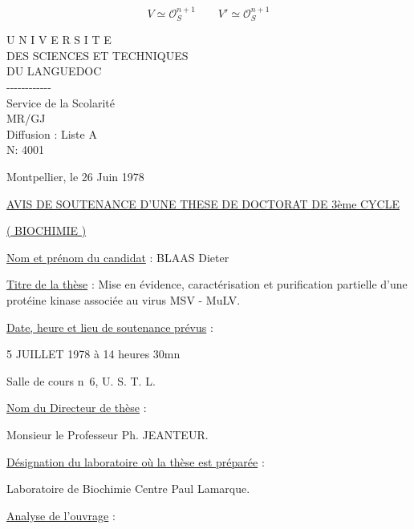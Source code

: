 \[
V\simeq\mathcal O_S^{n+1}\qquad V'\simeq\mathcal O_S^{n+1}
\]

\begin{center}
U N I V E R S I T E\\
DES SCIENCES ET TECHNIQUES\\
DU LANGUEDOC\\
-{}-{}-{}-{}-{}-{}-{}-{}-{}-{}-{}-\\
Service de la Scolarité\\
MR/GJ\\
Diffusion : Liste A\\
N\textdegree: 4001
\end{center}
Montpellier, le 26 Juin 1978

\begin{center}
\uline{AVIS DE SOUTENANCE D'UNE THESE DE DOCTORAT DE 3ème CYCLE}

\uline{( BIOCHIMIE )}
\end{center}

\uline{Nom et prénom du candidat} : BLAAS Dieter

\uline{Titre de la thèse} : Mise en évidence, caractérisation et purification partielle
d'une protéine kinase associée au virus MSV - MuLV.

\uline{Date, heure et lieu de soutenance prévus} :

5 JUILLET 1978 à 14 heures 30mn

Salle de cours n\textdegree\ 6, U. S. T. L.

\uline{Nom du Directeur de thèse} :

Monsieur le Professeur Ph. JEANTEUR.

\uline{Désignation du laboratoire où la thèse est préparée} :

Laboratoire de Biochimie Centre Paul Lamarque.

\uline{Analyse de l'ouvrage} :

